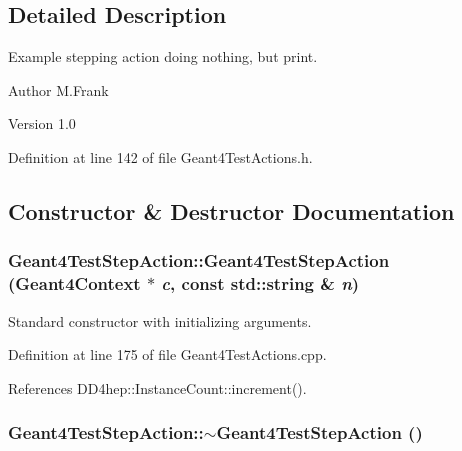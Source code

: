 \subsection{Detailed Description}
Example stepping action doing nothing, but print. \begin{DoxyAuthor}{Author}
M.Frank 
\end{DoxyAuthor}
\begin{DoxyVersion}{Version}
1.0 
\end{DoxyVersion}


Definition at line 142 of file Geant4TestActions.h.

\subsection{Constructor \& Destructor Documentation}
\hypertarget{class_d_d4hep_1_1_simulation_1_1_test_1_1_geant4_test_step_action_af4446b1635ed2c17bee1b7c074f3924d}{
\subsubsection[{Geant4TestStepAction}]{\setlength{\rightskip}{0pt plus 5cm}Geant4TestStepAction::Geant4TestStepAction ({\bf Geant4Context} $\ast$ {\em c}, \/  const std::string \& {\em n})}}
\label{class_d_d4hep_1_1_simulation_1_1_test_1_1_geant4_test_step_action_af4446b1635ed2c17bee1b7c074f3924d}


Standard constructor with initializing arguments. 

Definition at line 175 of file Geant4TestActions.cpp.

References DD4hep::InstanceCount::increment().\hypertarget{class_d_d4hep_1_1_simulation_1_1_test_1_1_geant4_test_step_action_a0b645a06c4e038b0800054558ad99964}{
\subsubsection[{$\sim$Geant4TestStepAction}]{\setlength{\rightskip}{0pt plus 5cm}Geant4TestStepAction::$\sim$Geant4TestStepAction ()}}
\label{class_d_d4hep_1_1_simulation_1_1_test_1_1_geant4_test_step_action_a0b645a06c4e038b0800054558ad99964}


